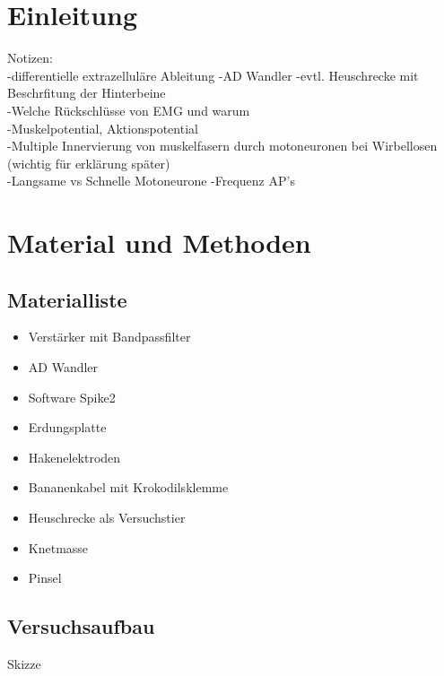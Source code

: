 \section{Einleitung}
Notizen: \\
-differentielle extrazelluläre Ableitung 
-AD Wandler
-evtl. Heuschrecke mit Beschrfitung der Hinterbeine \\
-Welche Rückschlüsse von EMG und warum\\
-Muskelpotential, Aktionspotential\\
-Multiple Innervierung von muskelfasern durch motoneuronen bei Wirbellosen (wichtig für erklärung später)\\
-Langsame vs Schnelle Motoneurone
-Frequenz AP's

\section{Material und Methoden}

\subsection{Materialliste}
\begin{itemize}
\item Verstärker mit Bandpassfilter
\item AD Wandler
\item Software Spike2
\item Erdungsplatte
\item Hakenelektroden
\item Bananenkabel mit Krokodilsklemme
\item Heuschrecke als Versuchstier 
\item Knetmasse
\item Pinsel
\end{itemize}
\subsection{Versuchsaufbau}
Skizze


